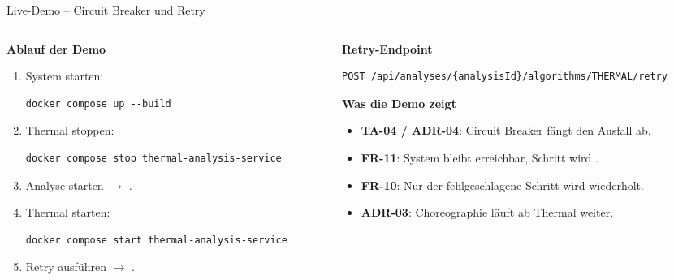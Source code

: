 
\begin{frame}[fragile]{Live-Demo -- Circuit Breaker und Retry}
  \begin{columns}[T,onlytextwidth]
    \begin{column}{0.5\textwidth}
      \textbf{Ablauf der Demo}
      \begin{enumerate}
        \item System starten:
          \begin{lstlisting}[style=bash]
docker compose up --build
          \end{lstlisting}
        \item Thermal stoppen:
          \begin{lstlisting}[style=bash]
docker compose stop thermal-analysis-service
          \end{lstlisting}
        \item Analyse starten $\rightarrow$ .
        \item Thermal starten:
          \begin{lstlisting}[style=bash]
docker compose start thermal-analysis-service
          \end{lstlisting}
        \item Retry ausführen $\rightarrow$ .
      \end{enumerate}
    \end{column}
    \begin{column}{0.46\textwidth}
      \textbf{Retry-Endpoint}
      \begin{lstlisting}[style=bash]
POST /api/analyses/{analysisId}/algorithms/THERMAL/retry
      \end{lstlisting}

      \vspace{0.1cm}
      \textbf{Was die Demo zeigt}
      \begin{itemize}
        \item \textbf{TA-04 / ADR-04}: Circuit Breaker fängt den Ausfall ab.
        \item \textbf{FR-11}: System bleibt erreichbar, Schritt wird .
        \item \textbf{FR-10}: Nur der fehlgeschlagene Schritt wird wiederholt.
        \item \textbf{ADR-03}: Choreographie läuft ab Thermal weiter.
      \end{itemize}
    \end{column}
  \end{columns}
\end{frame}

